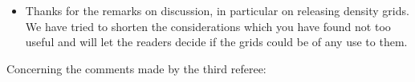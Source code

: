 \documentclass[11pt,a4paper,sans]{moderncv}        %
\begin{document}
\begin{itemize}
	\item Thanks for the remarks on discussion, in particular on releasing density grids. We have tried to shorten the considerations which you have found not too useful and will let the readers decide if the grids could be of any use to them.
\end{itemize}





Concerning the comments made by the third referee:
\end{document}
